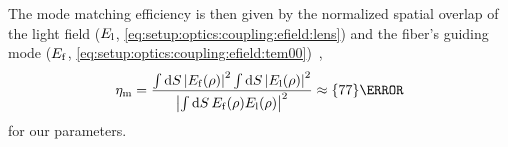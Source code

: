 The mode matching efficiency is then given by the normalized spatial overlap of the light field ($E_{\mathrm{l}}$, \cref{eq:setup:optics:coupling:efield:lens}) and the fiber's guiding mode ($E_{\mathrm{f}}$, \cref{eq:setup:optics:coupling:efield:tem00})~\cite{Paschotta2005},
\begin{equation}\label{eq:setup:optics:coupling:efficiency:mode_matching}
    \eta_{\mr{m}} = \frac{\int\dd{S}\abs{E_{\mr{f}}(\rho)}^2\int\dd{S}\abs{E_{\mr{l}}(\rho)}^2}{\abs{\int\dd{S} E_{\mr{f}}(\rho) E_{\mr{l}}(\rho)}^2} \approx\qty{77}{\percent}
\end{equation}
for our parameters.

